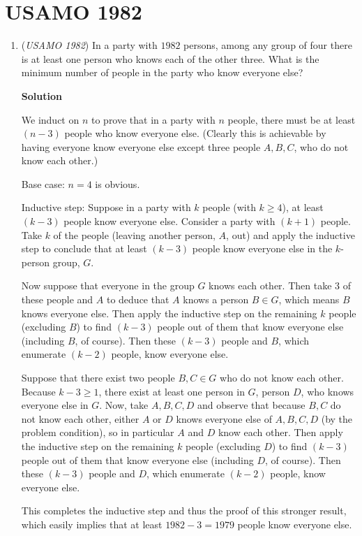 \section{USAMO 1982}
        \begin{enumerate}
        	\item (\textit{USAMO 1982}) In a party with $1982$ persons, among any group of four there is at least one person who knows each of the other three. What is the minimum number of people in the party who know everyone else?


 



\textbf{Solution}

We induct on $n$ to prove that in a party with $n$ people, there must be at least $(n-3)$ people who know everyone else. (Clearly this is achievable by having everyone know everyone else except three people $A, B, C$, who do not know each other.)

 Base case: $n = 4$ is obvious.

 Inductive step: Suppose in a party with $k$ people (with $k \ge 4$), at least $(k-3)$ people know everyone else. Consider a party with $(k+1)$ people. Take $k$ of the people (leaving another person, $A$, out) and apply the inductive step to conclude that at least $(k-3)$ people know everyone else in the $k$-person group, $G$.

 Now suppose that everyone in the group $G$ knows each other. Then take $3$ of these people and $A$ to deduce that $A$ knows a person $B \in G$, which means $B$ knows everyone else. Then apply the inductive step on the remaining $k$ people (excluding $B$) to find $(k-3)$ people out of them that know everyone else (including $B$, of course). Then these $(k-3)$ people and $B$, which enumerate $(k-2)$ people, know everyone else.

 Suppose that there exist two people $B, C \in G$ who do not know each other. Because $k-3 \ge 1$, there exist at least one person in $G$, person $D$, who knows everyone else in $G$. Now, take $A, B, C, D$ and observe that because $B, C$ do not know each other, either $A$ or $D$ knows everyone else of $A, B, C, D$ (by the problem condition), so in particular $A$ and $D$ know each other. Then apply the inductive step on the remaining $k$ people (excluding $D$) to find $(k-3)$ people out of them that know everyone else (including $D$, of course). Then these $(k-3)$ people and $D$, which enumerate $(k-2)$ people, know everyone else.

 This completes the inductive step and thus the proof of this stronger result, which easily implies that at least $1982 - 3 = \boxed{1979}$ people know everyone else.


\end{enumerate}
